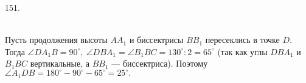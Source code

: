 151.  \begin{figure}[ht!]
\end{figure}\\
Пусть продолжения высоты $AA_1$ и биссектрисы $BB_1$ пересеклись в точке $D.$ Тогда $\angle DA_1B=90^\circ,\ \angle DBA_1=\angle B_1BC=130^\circ:2=65^\circ$ (так как углы $DBA_1$ и $B_1BC$ вертикальные, а $BB_1$ --- биссектриса). Поэтому $\angle A_1DB=180^\circ-90^\circ-65^\circ=25^\circ.$\\
